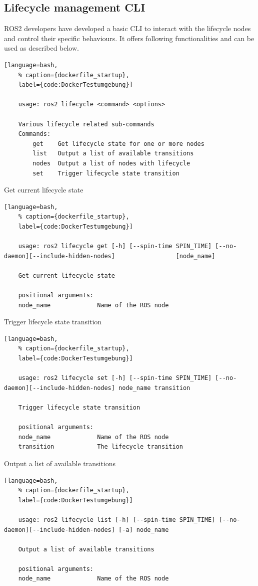 \subsection{Lifecycle management CLI} ROS2 developers have developed a basic CLI to interact with the lifecycle nodes and control their specific behaviours. 
It offers following functionalities and can be used as described below.
\begin{lstlisting}[language=bash,
	% caption={dockerfile_startup}, 
	label={code:DockerTestumgebung}]
	
	usage: ros2 lifecycle <command> <options>

	Various lifecycle related sub-commands
	Commands:
		get    Get lifecycle state for one or more nodes
		list   Output a list of available transitions
		nodes  Output a list of nodes with lifecycle
		set    Trigger lifecycle state transition
\end{lstlisting}

Get current lifecycle state
\begin{lstlisting}[language=bash,
	% caption={dockerfile_startup}, 
	label={code:DockerTestumgebung}]
	
	usage: ros2 lifecycle get [-h] [--spin-time SPIN_TIME] [--no-daemon][--include-hidden-nodes]                 [node_name]

	Get current lifecycle state
	
	positional arguments:
	node_name             Name of the ROS node
\end{lstlisting}

Trigger lifecycle state transition
\begin{lstlisting}[language=bash,
	% caption={dockerfile_startup}, 
	label={code:DockerTestumgebung}]
	
	usage: ros2 lifecycle set [-h] [--spin-time SPIN_TIME] [--no-daemon][--include-hidden-nodes] node_name transition

	Trigger lifecycle state transition

	positional arguments:
	node_name             Name of the ROS node
	transition            The lifecycle transition
\end{lstlisting}

Output a list of available transitions
\begin{lstlisting}[language=bash,
	% caption={dockerfile_startup}, 
	label={code:DockerTestumgebung}]
	
	usage: ros2 lifecycle list [-h] [--spin-time SPIN_TIME] [--no-daemon][--include-hidden-nodes] [-a] node_name

	Output a list of available transitions

	positional arguments:
	node_name             Name of the ROS node
	
\end{lstlisting}

